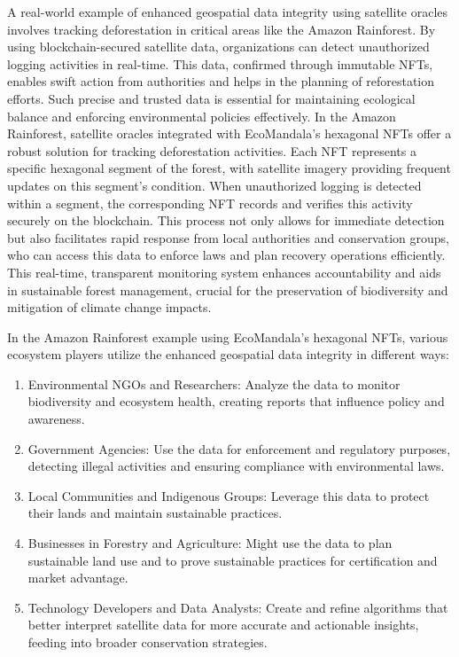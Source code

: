 \documentclass{scrreport}
\begin{document}
A real-world example of enhanced geospatial data integrity using satellite oracles involves tracking deforestation in critical areas like the Amazon Rainforest. By using blockchain-secured satellite data, organizations can detect unauthorized logging activities in real-time. This data, confirmed through immutable NFTs, enables swift action from authorities and helps in the planning of reforestation efforts. Such precise and trusted data is essential for maintaining ecological balance and enforcing environmental policies effectively.
In the Amazon Rainforest, satellite oracles integrated with EcoMandala’s hexagonal NFTs offer a robust solution for tracking deforestation activities. Each NFT represents a specific hexagonal segment of the forest, with satellite imagery providing frequent updates on this segment’s condition. When unauthorized logging is detected within a segment, the corresponding NFT records and verifies this activity securely on the blockchain. This process not only allows for immediate detection but also facilitates rapid response from local authorities and conservation groups, who can access this data to enforce laws and plan recovery operations efficiently. This real-time, transparent monitoring system enhances accountability and aids in sustainable forest management, crucial for the preservation of biodiversity and mitigation of climate change impacts.

In the Amazon Rainforest example using EcoMandala's hexagonal NFTs, various ecosystem players utilize the enhanced geospatial data integrity in different ways:
\begin{enumerate}
    \item Environmental NGOs and Researchers: Analyze the data to monitor biodiversity and ecosystem health, creating reports that influence policy and awareness.
    \item Government Agencies: Use the data for enforcement and regulatory purposes, detecting illegal activities and ensuring compliance with environmental laws.
    \item Local Communities and Indigenous Groups: Leverage this data to protect their lands and maintain sustainable practices.
    \item Businesses in Forestry and Agriculture: Might use the data to plan sustainable land use and to prove sustainable practices for certification and market advantage.
    \item Technology Developers and Data Analysts: Create and refine algorithms that better interpret satellite data for more accurate and actionable insights, feeding into broader conservation strategies.
\end{enumerate}
\end{document}
